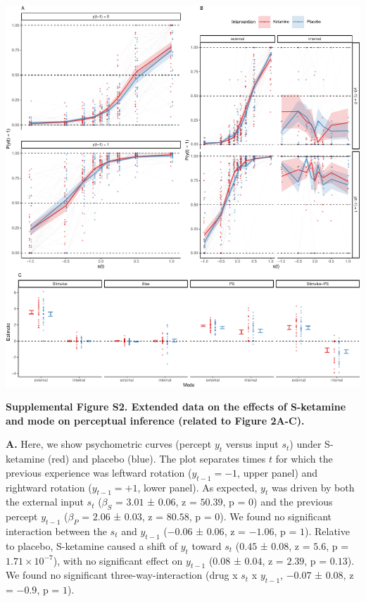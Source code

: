 \documentclass[
]{article}
\begin{document}
\includegraphics{modes_ketamine_scz_files/figure-latex/Supplemental_Figure_S2-1.pdf}

\textbf{Supplemental Figure S2. Extended data on the effects of
S-ketamine and mode on perceptual inference (related to Figure 2A-C).}

\textbf{A.} Here, we show psychometric curves (percept \(y_t\) versus
input \(s_t\)) under S-ketamine (red) and placebo (blue). The plot
separates times \(t\) for which the previous experience was leftward
rotation (\(y_{t-1} = -1\), upper panel) and rightward rotation
(\(y_{t-1} = +1\), lower panel). As expected, \(y_t\) was driven by both
the external input \(s_t\) (\(\beta_S\) = \(3.01\) ± \(0.06\), z =
\(50.39\), p = \(0\)) and the previous percept \(y_{t-1}\)
(\(\beta_{P}\) = \(2.06\) ± \(0.03\), z = \(80.58\), p = \(0\)). We
found no significant interaction between the \(s_t\) and \(y_{t-1}\)
(\(-0.06\) ± \(0.06\), z = \(-1.06\), p = \(1\)). Relative to placebo,
S-ketamine caused a shift of \(y_t\) toward \(s_t\) (\(0.45\) ±
\(0.08\), z = \(5.6\), p = \(\ensuremath{1.71\times 10^{-7}}\)), with no
significant effect on \(y_{t-1}\) (\(0.08\) ± \(0.04\), z = \(2.39\), p
= \(0.13\)). We found no significant three-way-interaction (drug x
\(s_t\) x \(y_{t-1}\), \(-0.07\) ± \(0.08\), z = \(-0.9\), p = \(1\)).
\end{document}
